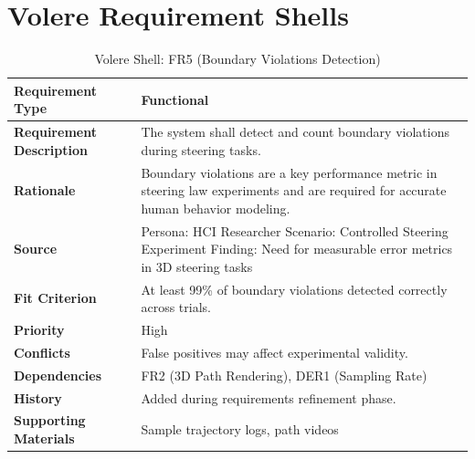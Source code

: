 \documentclass[sigconf]{acmart}
\begin{document}
\section{Volere Requirement Shells}

\begin{table}[h!]
\centering
\caption{Volere Shell: FR5 (Boundary Violations Detection)}
\begin{tabular}{|p{3.5cm}|p{4.5cm}|}
\hline
\textbf{Requirement Type} & Functional \\ \hline

\textbf{Requirement Description} &
The system shall detect and count boundary violations during steering tasks. \\ \hline

\textbf{Rationale} &
Boundary violations are a key performance metric in steering law experiments and are required for accurate human behavior modeling. \\ \hline

\textbf{Source} &
Persona: HCI Researcher \newline
Scenario: Controlled Steering Experiment \newline
Finding: Need for measurable error metrics in 3D steering tasks \\ \hline

\textbf{Fit Criterion} &
At least 99\% of boundary violations detected correctly across trials. \\ \hline

\textbf{Priority} &
High \\ \hline

\textbf{Conflicts} &
False positives may affect experimental validity. \\ \hline

\textbf{Dependencies} &
FR2 (3D Path Rendering), DER1 (Sampling Rate) \\ \hline

\textbf{History} &
Added during requirements refinement phase. \\ \hline

\textbf{Supporting Materials} &
Sample trajectory logs, path videos \\ \hline
\end{tabular}
\end{table}
\end{document}
